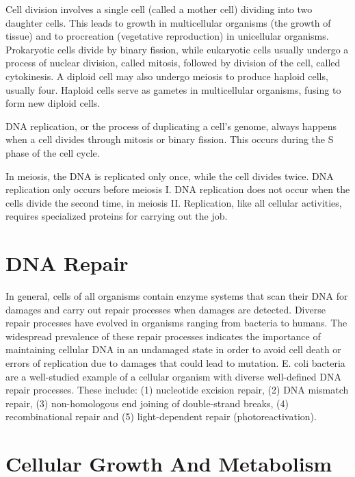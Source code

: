 Cell division involves a single cell (called a mother cell) dividing into two daughter cells. This leads to growth in multicellular organisms (the growth of tissue) and to procreation (vegetative reproduction) in unicellular organisms. Prokaryotic cells divide by binary fission, while eukaryotic cells usually undergo a process of nuclear division, called mitosis, followed by division of the cell, called cytokinesis. A diploid cell may also undergo meiosis to produce haploid cells, usually four. Haploid cells serve as gametes in multicellular organisms, fusing to form new diploid cells.

DNA replication, or the process of duplicating a cell's genome, always happens when a cell divides through mitosis or binary fission. This occurs during the S phase of the cell cycle.

In meiosis, the DNA is replicated only once, while the cell divides twice. DNA replication only occurs before meiosis I. DNA replication does not occur when the cells divide the second time, in meiosis II. Replication, like all cellular activities, requires specialized proteins for carrying out the job.

\hypertarget{dna-repair}{%
\section{DNA Repair}\label{dna-repair}}

In general, cells of all organisms contain enzyme systems that scan their DNA for damages and carry out repair processes when damages are detected. Diverse repair processes have evolved in organisms ranging from bacteria to humans. The widespread prevalence of these repair processes indicates the importance of maintaining cellular DNA in an undamaged state in order to avoid cell death or errors of replication due to damages that could lead to mutation. E. coli bacteria are a well-studied example of a cellular organism with diverse well-defined DNA repair processes. These include: (1) nucleotide excision repair, (2) DNA mismatch repair, (3) non-homologous end joining of double-strand breaks, (4) recombinational repair and (5) light-dependent repair (photoreactivation).

\hypertarget{cellular-growth-and-metabolism}{%
\section{Cellular Growth And Metabolism}\label{cellular-growth-and-metabolism}}

